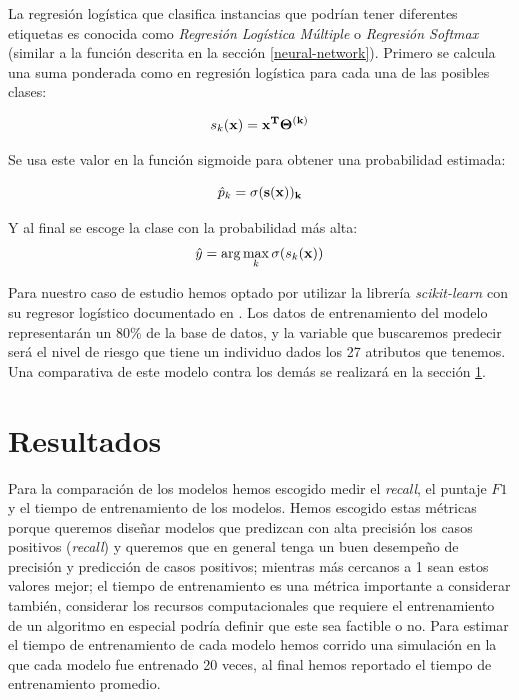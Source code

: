 \documentclass[journal]{IEEEtran}                                                          %
\begin{document}
                La regresión logística que clasifica instancias que podrían tener diferentes etiquetas es conocida como \emph{Regresión Logística Múltiple} o \emph{Regresión Softmax} (similar a la función descrita en la sección \ref{neural-network}). Primero se calcula una suma ponderada como en regresión logística para cada una de las posibles clases:

                \begin{equation}
                    s_k(\bf{x}) = \bf{x}^T \Theta^{(k)}
                \end{equation}

                Se usa este valor en la función sigmoide para obtener una probabilidad estimada:

                \begin{equation}
                    \hat{p}_k = \sigma(\bf{s}(\bf{x}))_k
                \end{equation}

                Y al final se escoge la clase con la probabilidad más alta:
                \begin{equation}
                    \hat{y} = \arg\max_k \sigma(s_k(\bf{x}))
                \end{equation}
            
            Para nuestro caso de estudio hemos optado por utilizar la librería \emph{scikit-learn} con su regresor logístico documentado en \cite{sci-kit-learn-no-dateB}. Los datos de entrenamiento del modelo representarán un 80\% de la base de datos, y la variable que buscaremos predecir será el nivel de riesgo que tiene un individuo dados los 27 atributos que tenemos. Una comparativa de este modelo contra los demás se realizará en la sección \ref{resultados}.

    \section{Resultados} \label{resultados}
        
        Para la comparación de los modelos hemos escogido medir el \emph{recall}, el puntaje $F1$ y el tiempo de entrenamiento de los modelos. Hemos escogido estas métricas porque queremos diseñar modelos que predizcan con alta precisión los casos positivos (\emph{recall}) y queremos que en general tenga un buen desempeño de precisión y predicción de casos positivos; mientras más cercanos a 1 sean estos valores mejor; el tiempo de entrenamiento es una métrica importante a considerar también, considerar los recursos computacionales que requiere el entrenamiento de un algoritmo en especial podría definir que este sea factible o no. Para estimar el tiempo de entrenamiento de cada modelo hemos corrido una simulación en la que cada modelo fue entrenado 20 veces, al final hemos reportado el tiempo de entrenamiento promedio.
        
\end{document}
